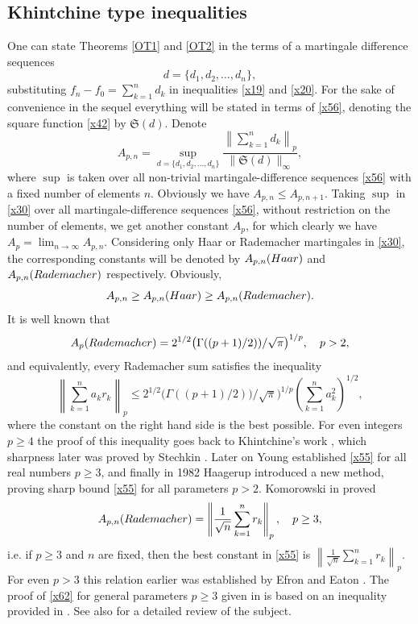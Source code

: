 \documentclass[12pt,reqno,fleqn]{amsart}
\theoremstyle{definition}
\theoremstyle{definition}
\theoremstyle{remark}
\def\ZS{\ensuremath{\mathfrak S}}
\numberwithin{equation}{section}
\newcommand {\e }[1]{\eqref{#1}}
\begin{document}
\subsection{Khintchine type inequalities}
One can state Theorems \ref{OT1} and \ref{OT2} in the terms of a martingale difference sequences 
\begin{equation}\label{x56}
	d=\{d_1,d_2,\ldots,d_n\}, 
\end{equation}
substituting $f_n-f_0=\sum_{k=1}^nd_k$ in inequalities \e{x19} and \e{x20}. For the sake of convenience in the sequel everything will be stated in terms  of \e{x56}, denoting the square function \e{x42} by $\ZS(d)$. Denote
\begin{equation}\label{x30}
	A_{p,n}=\sup_{d=\{d_1,d_2,\ldots,d_n\}}\frac{	\left\|\sum_{k=1}^nd_k\right\|_p}{\|\ZS(d)\|_\infty},
\end{equation}
where $\sup$ is taken over all non-trivial martingale-difference sequences \e{x56} with a fixed number of elements $n$.  Obviously we have $A_{p,n}\le A_{p,n+1}$. Taking $\sup$ in \e{x30} over all martingale-difference sequences \e{x56}, without restriction on the number of elements, we get another constant $A_p$, for which clearly we have $A_p=\lim_{n\to\infty}A_{p,n}$. Considering only Haar or Rademacher martingales in \e{x30}, the corresponding constants will be denoted by $A_{p,n}({\rm Haar})$ and $A_{p,n}({\rm Rademacher})$ respectively. Obviously,
\begin{equation}\label{x45}
	A_{p,n}\ge A_{p,n}({\rm Haar})\ge A_{p,n}({\rm Rademacher}).
\end{equation}
It is well known that
\begin{equation}\label{x65}
	A_p({\rm Rademacher})=2^{1/2}\big(\Gamma((p+1)/2))/\sqrt{\pi}\big)^{1/p},\quad p>2,
\end{equation}
and equivalently, every Rademacher sum satisfies the inequality
\begin{equation}\label{x55}
	\left\|\sum_{k=1}^na_kr_k\right\|_p\le 2^{1/2}\big(\Gamma((p+1)/2))/\sqrt{\pi}\big)^{1/p}\left(\sum_{k=1}^na_k^2\right)^{1/2},
\end{equation}
where the constant on the right hand side is the best possible. For even integers $p\ge 4$ the proof of this inequality goes back to Khintchine's work \cite{Khi}, which sharpness later was proved by Stechkin \cite{Ste}.  Later on Young \cite{You} established \e{x55} for all real numbers $p\ge 3$, and finally in 1982 Haagerup \cite{Haa} introduced a new method, proving sharp bound \e{x55} for all parameters $p>2$. Komorowski in \cite{Kom} proved 
\begin{equation}\label{x62}
	A_{p,n}({\rm Rademacher})=\left\|\frac{1}{\sqrt{n}}\sum_{k=1}^nr_k\right\|_p,\quad p\ge 3,
\end{equation}
i.e.  if $p\ge 3$ and $n$ are fixed, then the best constant in \e{x55} is $\left\|\frac{1}{\sqrt{n}}\sum_{k=1}^nr_k\right\|_p$. 
For even $p>3$ this relation earlier was established by Efron \cite{Efr} and Eaton \cite{Eat}. The proof of \e{x62} for general parameters $p\ge 3$ given in \cite{Kom} is based on an inequality provided in \cite{Eat}. See also \cite{PeSh} for a detailed review of the subject.
\end{document}
